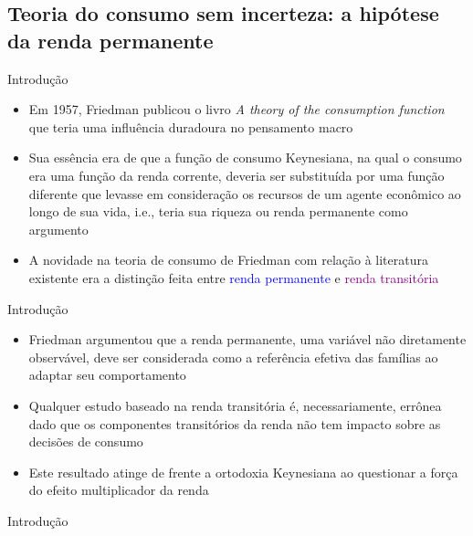 \documentclass[10pt]{beamer}
\begin{document}
\subsection{Teoria do consumo sem incerteza: a hipótese da renda permanente}
\begin{frame}{Introdução}
    \begin{itemize}
        \item Em 1957, Friedman publicou o livro \emph{A theory of the consumption function} que teria uma influência duradoura no pensamento macro
        \bigskip
        \item Sua essência era de que a função de consumo Keynesiana, na qual o consumo era uma função da renda corrente, deveria ser substituída por uma função diferente que levasse em consideração os recursos de um agente econômico ao longo de sua vida, i.e., teria sua riqueza ou renda permanente como argumento
        \bigskip
        \item A novidade na teoria de consumo de Friedman com relação à literatura existente era a distinção feita entre \textcolor{blue}{renda permanente} e \textcolor{purple}{renda transitória}
    \end{itemize}
\end{frame}

\begin{frame}{Introdução}
    \begin{itemize}
        \item Friedman argumentou que a renda permanente, uma variável não diretamente observável, deve ser considerada como a referência efetiva das famílias ao adaptar seu comportamento
        \bigskip
        \item Qualquer estudo baseado na renda transitória é, necessariamente, errônea dado que os componentes transitórios da renda não tem impacto sobre as decisões de consumo
        \bigskip
        \item Este resultado atinge de frente a ortodoxia Keynesiana ao questionar a força do efeito multiplicador da renda
    \end{itemize}
\end{frame}

\begin{frame}{Introdução}
\end{frame}
\end{document}
